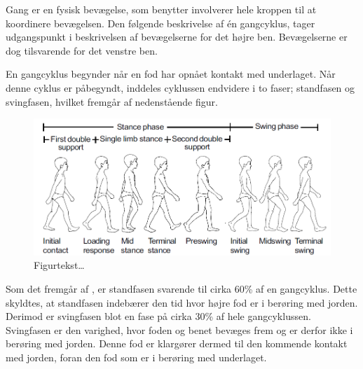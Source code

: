 Gang er en fysisk bevægelse, som benytter involverer hele kroppen til at koordinere bevægelsen. Den følgende beskrivelse af én gangcyklus, tager udgangspunkt i beskrivelsen af bevægelserne for det højre ben. Bevægelserne er dog tilsvarende for det venstre ben. \citep{VaughanDavisOConnor1992}

En gangcyklus begynder når en fod har opnået kontakt med underlaget. Når denne cyklus er påbegyndt, inddeles cyklussen endvidere i to faser; standfasen og svingfasen, hvilket fremgår af nedenstående figur. 

\begin{figure}[H]
	\centering
	\includegraphics[scale=0.55]{figures/bProblemloesning/gang_cyklus.png}
	\caption{Figurtekst…  \cite{VaughanDavisOConnor1992}}
	\label{fig:gang_cyklus}
\end{figure}

Som det fremgår af , er standfasen svarende til cirka 60\% af en gangcyklus. Dette skyldtes, at standfasen indebærer den tid hvor højre fod er i berøring med jorden. Derimod er svingfasen blot en fase på cirka 30\% af hele gangcyklussen. Svingfasen er den varighed, hvor foden og benet bevæges frem og er derfor ikke i berøring med jorden. Denne fod er klargører dermed til den kommende kontakt med jorden, foran den fod som er i berøring med underlaget.


